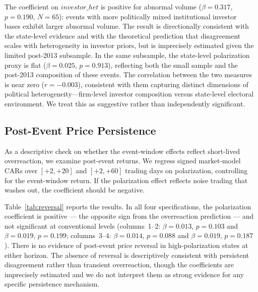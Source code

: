 \documentclass[12pt]{article}
\begin{document}
The coefficient on $\mathit{investor\_het}$ is positive for abnormal
volume ($\beta = 0.317$, $p = 0.190$, $N = 65$): events with more
politically mixed institutional investor bases exhibit larger abnormal
volume. The result is directionally consistent with the state-level
evidence and with the theoretical prediction that disagreement scales
with heterogeneity in investor priors, but is imprecisely estimated
given the limited post-2013 subsample. In the same subsample, the
state-level polarization proxy is flat ($\beta = 0.025$, $p = 0.913$),
reflecting both the small sample and the post-2013 composition of these
events. The correlation between the two measures is near zero
($r = -0.003$), consistent with them capturing distinct dimensions of
political heterogeneity---firm-level investor composition versus
state-level electoral environment. We treat this as suggestive rather
than independently significant.

\subsection{Post-Event Price Persistence}
\label{sec:reversal}

As a descriptive check on whether the event-window effects reflect
short-lived overreaction, we examine post-event returns. We regress
signed market-model CARs over $[+2,+20]$ and $[+2,+60]$ trading days
on polarization, controlling for the event-window return. If the
polarization effect reflects noise trading that washes out, the
coefficient should be negative.

Table~\ref{tab:reversal} reports the results. In all four specifications,
the polarization coefficient is positive --- the opposite sign from
the overreaction prediction --- and not significant at conventional levels
(columns~1--2: $\beta = 0.013$, $p = 0.103$ and $\beta = 0.019$,
$p = 0.199$; columns~3--4: $\beta = 0.014$,
$p = 0.088$ and $\beta = 0.019$, $p = 0.187$). There is no evidence
of post-event price reversal in high-polarization states at either
horizon. The absence of reversal is descriptively consistent with
persistent disagreement rather than transient overreaction, though the
coefficients are imprecisely estimated and we do not interpret them as
strong evidence for any specific persistence mechanism.



\end{document}

